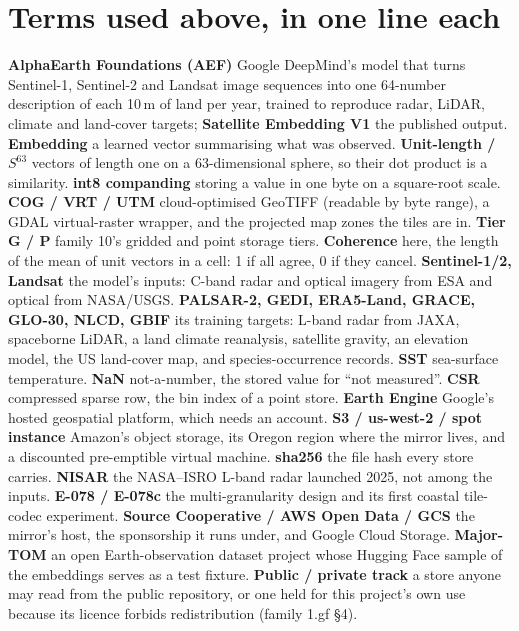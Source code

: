 \documentclass[10pt]{article}
\begin{document}
\section*{Terms used above, in one line each}
\footnotesize
\textbf{AlphaEarth Foundations (AEF)} Google DeepMind's model that turns Sentinel-1, Sentinel-2 and Landsat image sequences into one 64-number description of each 10\,m of land per year, trained to reproduce radar, LiDAR, climate and land-cover targets; \textbf{Satellite Embedding V1} the published output. \textbf{Embedding} a learned vector summarising what was observed. \textbf{Unit-length / $S^{63}$} vectors of length one on a 63-dimensional sphere, so their dot product is a similarity. \textbf{int8 companding} storing a value in one byte on a square-root scale. \textbf{COG / VRT / UTM} cloud-optimised GeoTIFF (readable by byte range), a GDAL virtual-raster wrapper, and the projected map zones the tiles are in. \textbf{Tier G / P} family 10's gridded and point storage tiers. \textbf{Coherence} here, the length of the mean of unit vectors in a cell: 1 if all agree, 0 if they cancel. \textbf{Sentinel-1/2, Landsat} the model's inputs: C-band radar and optical imagery from ESA and optical from NASA/USGS. \textbf{PALSAR-2, GEDI, ERA5-Land, GRACE, GLO-30, NLCD, GBIF} its training targets: L-band radar from JAXA, spaceborne LiDAR, a land climate reanalysis, satellite gravity, an elevation model, the US land-cover map, and species-occurrence records. \textbf{SST} sea-surface temperature. \textbf{NaN} not-a-number, the stored value for ``not measured''. \textbf{CSR} compressed sparse row, the bin index of a point store. \textbf{Earth Engine} Google's hosted geospatial platform, which needs an account. \textbf{S3 / us-west-2 / spot instance} Amazon's object storage, its Oregon region where the mirror lives, and a discounted pre-emptible virtual machine. \textbf{sha256} the file hash every store carries. \textbf{NISAR} the NASA--ISRO L-band radar launched 2025, not among the inputs. \textbf{E-078 / E-078c} the multi-granularity design and its first coastal tile-codec experiment. \textbf{Source Cooperative / AWS Open Data / GCS} the mirror's host, the sponsorship it runs under, and Google Cloud Storage. \textbf{Major-TOM} an open Earth-observation dataset project whose Hugging Face sample of the embeddings serves as a test fixture. \textbf{Public / private track} a store anyone may read from the public repository, or one held for this project's own use because its licence forbids redistribution (family 1.gf \S4).
\normalsize
\end{document}
